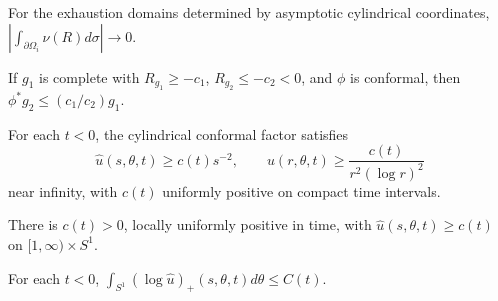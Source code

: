 \begin{lemma}
\label{lem:chow-iv-first-boundary-term}


For the exhaustion domains determined by asymptotic cylindrical coordinates,
\(\left|\int_{\partial\Omega_i}\nu(R)d\sigma\right|\to0\).
\end{lemma}

\begin{lemma}
\label{lem:chow-iv-schwarz-pick}

If \(g_1\) is complete with \(R_{g_1}\ge-c_1\), \(R_{g_2}\le-c_2<0\), and
\(\phi\) is conformal, then \(\phi^*g_2\le(c_1/c_2)g_1\).
\end{lemma}

\begin{lemma}
\label{lem:chow-iv-hyperbolic-cusp-barrier}


For each \(t<0\), the cylindrical conformal factor satisfies
\[
 \widehat u(s,\theta,t)\ge c(t)s^{-2},\qquad
 u(r,\theta,t)\ge\frac{c(t)}{r^2(\log r)^2}
\]
near infinity, with \(c(t)\) uniformly positive on compact time intervals.
\end{lemma}

\begin{lemma}
\label{lem:chow-iv-conformal-factor-lower}


There is \(c(t)>0\), locally uniformly positive in time, with
\(\widehat u(s,\theta,t)\ge c(t)\) on \([1,\infty)\times S^1\).
\end{lemma}

\begin{lemma}
\label{lem:chow-iv-conformal-factor-averages}


For each \(t<0\), \(\int_{S^1}(\log\widehat u)_+(s,\theta,t)d\theta\le C(t)\).
\end{lemma}

